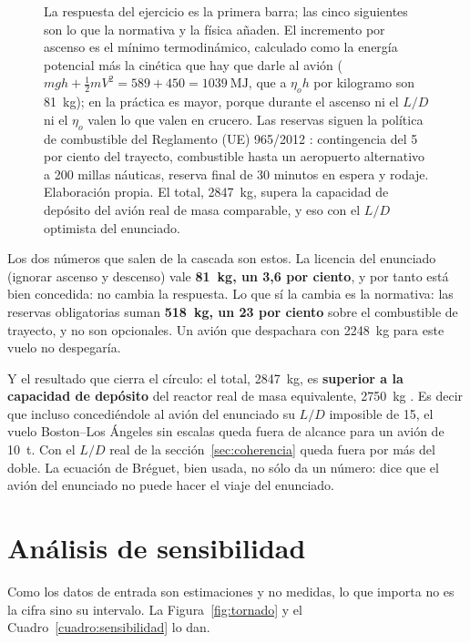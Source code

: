 \documentclass[11pt,letterpaper]{article}
\begin{document}
\begin{figure}[htbp]
\begin{tikzpicture}
\end{tikzpicture}
\caption{La respuesta del ejercicio es la primera barra; las cinco siguientes
son lo que la normativa y la física añaden. El incremento por ascenso es el
mínimo termodinámico, calculado como la energía potencial más la cinética que
hay que darle al avión
(\(mgh + \tfrac{1}{2}mV^{2} = \num{589} + \num{450} = \SI{1039}{\mega\joule}\),
que a \(\eta_o h\) por kilogramo son \SI{81}{\kilogram}); en la práctica es
mayor, porque durante el ascenso ni el \(L/D\) ni el \(\eta_o\) valen lo que
valen en crucero. Las reservas siguen la política de combustible del Reglamento
(UE) 965/2012 \parencite{easa965}: contingencia del 5 por ciento del trayecto,
combustible hasta un aeropuerto alternativo a \num{200} millas náuticas,
reserva final de 30 minutos en espera y rodaje. Elaboración propia. El total,
\SI{2847}{\kilogram}, supera la capacidad de depósito del avión real de masa
comparable, y eso con el \(L/D\) optimista del enunciado.}
\label{fig:cascada}
\end{figure}

Los dos números que salen de la cascada son estos. La licencia del enunciado
(ignorar ascenso y descenso) vale \textbf{\SI{81}{\kilogram}, un 3,6 por
ciento}, y por tanto está bien concedida: no cambia la respuesta. Lo que sí la
cambia es la normativa: las reservas obligatorias suman
\textbf{\SI{518}{\kilogram}, un 23 por ciento} sobre el combustible de
trayecto, y no son opcionales. Un avión que despachara con
\SI{2248}{\kilogram} para este vuelo no despegaría.

Y el resultado que cierra el círculo: el total, \SI{2847}{\kilogram}, es
\textbf{superior a la capacidad de depósito} del reactor real de masa
equivalente, \SI{2750}{\kilogram} \parencite{learjet75}. Es decir que incluso
concediéndole al avión del enunciado su \(L/D\) imposible de 15, el vuelo
Boston--Los Ángeles sin escalas queda fuera de alcance para un avión de
\SI{10}{\tonne}. Con el \(L/D\) real de la sección~\ref{sec:coherencia} queda
fuera por más del doble. La ecuación de Bréguet, bien usada, no sólo da un
número: dice que el avión del enunciado no puede hacer el viaje del enunciado.

\section{Análisis de sensibilidad}

Como los datos de entrada son estimaciones y no medidas, lo que importa no es
la cifra sino su intervalo. La Figura~\ref{fig:tornado} y el
Cuadro~\ref{cuadro:sensibilidad} lo dan.
\end{document}
